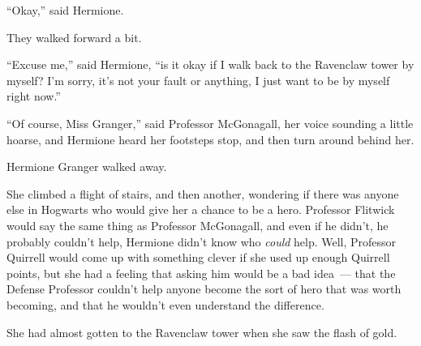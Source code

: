 ``Okay,'' said Hermione.

They walked forward a bit.

``Excuse me,'' said Hermione, ``is it okay if I walk back to the Ravenclaw tower by myself? I'm sorry, it's not your fault or anything, I just want to be by myself right now.''

``Of course, Miss Granger,'' said Professor McGonagall, her voice sounding a little hoarse, and Hermione heard her footsteps stop, and then turn around behind her.

Hermione Granger walked away.

She climbed a flight of stairs, and then another, wondering if there was anyone else in Hogwarts who would give her a chance to be a hero. Professor Flitwick would say the same thing as Professor McGonagall, and even if he didn't, he probably couldn't help, Hermione didn't know who \emph{could} help. Well, Professor Quirrell would come up with something clever if she used up enough Quirrell points, but she had a feeling that asking him would be a bad idea~--- that the Defense Professor couldn't help anyone become the sort of hero that was worth becoming, and that he wouldn't even understand the difference.

She had almost gotten to the Ravenclaw tower when she saw the flash of gold.
